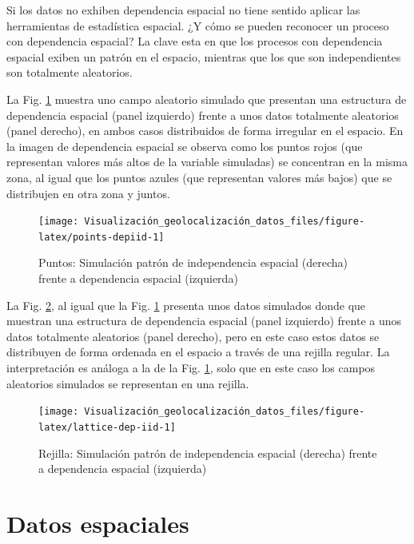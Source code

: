 \documentclass[
]{report}
\theoremstyle{definition}
\theoremstyle{definition}
\theoremstyle{definition}
\theoremstyle{definition}
\theoremstyle{remark}
\begin{document}
Si los datos no exhiben dependencia espacial no tiene sentido aplicar las
herramientas de estadística espacial. ¿Y cómo se pueden reconocer un proceso con
dependencia espacial? La clave esta en que los procesos con dependencia espacial
exiben un patrón en el espacio, mientras que los que son independientes son
totalmente aleatorios.

La Fig. \ref{fig:points-depiid} muestra uno campo aleatorio simulado que
presentan una estructura de dependencia espacial (panel izquierdo) frente a unos
datos totalmente aleatorios (panel derecho), en ambos casos distribuidos de
forma irregular en el espacio. En la imagen de dependencia espacial se observa
como los puntos rojos (que representan valores más altos de la variable
simuladas) se concentran en la misma zona, al igual que los puntos azules (que
representan valores más bajos) que se distribujen en otra zona y juntos.

\begin{figure}

{\centering \texttt{[image: Visualización\_geolocalización\_datos\_files/figure-latex/points-depiid-1]} 

}

\caption{Puntos: Simulación patrón de independencia espacial (derecha) frente a dependencia espacial (izquierda)}\label{fig:points-depiid}
\end{figure}

La Fig. \ref{fig:lattice-dep-iid}, al igual que la Fig.
\ref{fig:points-depiid} presenta unos datos simulados donde que muestran una
estructura de dependencia espacial (panel izquierdo) frente a unos datos
totalmente aleatorios (panel derecho), pero en este caso estos datos se
distribuyen de forma ordenada en el espacio a través de una rejilla regular. La
interpretación es análoga a la de la Fig. \ref{fig:points-depiid}, solo que en
este caso los campos aleatorios simulados se representan en una rejilla.

\begin{figure}

{\centering \texttt{[image: Visualización\_geolocalización\_datos\_files/figure-latex/lattice-dep-iid-1]} 

}

\caption{Rejilla: Simulación patrón de independencia espacial (derecha) frente a dependencia espacial (izquierda)}\label{fig:lattice-dep-iid}
\end{figure}

\hypertarget{datos-espaciales}{%
\section{Datos espaciales}\label{datos-espaciales}}
\end{document}
